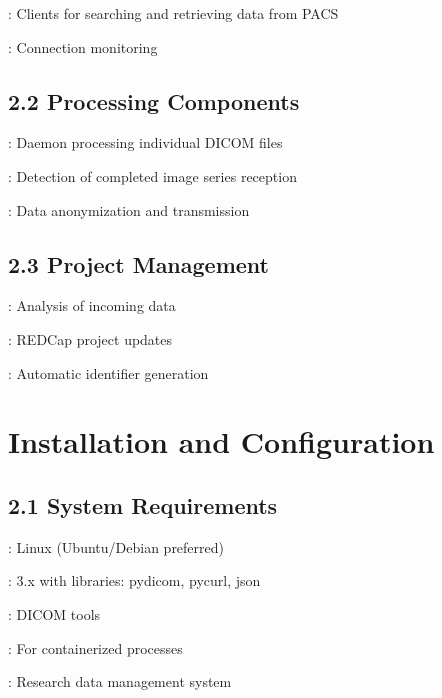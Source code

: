 \documentclass[letterpaper,10pt,english]{sphinxmanual}
\begin{document}
\sphinxAtStartPar
{}: Clients for searching and retrieving data from PACS

\sphinxAtStartPar
{}: Connection monitoring


\subsection{2.2 Processing Components}
\label{\detokenize{Temp/admin-options:processing-components}}
\sphinxAtStartPar
{}: Daemon processing individual DICOM files

\sphinxAtStartPar
{}: Detection of completed image series reception

\sphinxAtStartPar
{}: Data anonymization and transmission


\subsection{2.3 Project Management}
\label{\detokenize{Temp/admin-options:project-management}}
\sphinxAtStartPar
{}: Analysis of incoming data

\sphinxAtStartPar
{}: REDCap project updates

\sphinxAtStartPar
{}: Automatic identifier generation


\section{Installation and Configuration}
\label{\detokenize{Temp/admin-options:installation-and-configuration}}

\subsection{2.1 System Requirements}
\label{\detokenize{Temp/admin-options:system-requirements}}
\sphinxAtStartPar
{}: Linux (Ubuntu/Debian preferred)

\sphinxAtStartPar
{}: 3.x with libraries: pydicom, pycurl, json

\sphinxAtStartPar
{}: DICOM tools

\sphinxAtStartPar
{}: For containerized processes

\sphinxAtStartPar
{}: Research data management system
\end{document}
